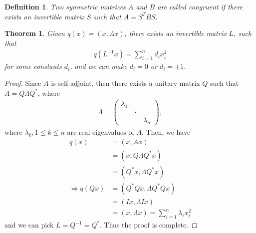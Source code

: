 \documentclass[11pt]{book}
\newtheorem{definition}{Definition}[section]
\newtheorem{theorem}{Theorem}[section]
\theoremstyle{definition}
\numberwithin{equation}{chapter}
\begin{document}
\medskip

\begin{definition}
Two symmetric matrices $A$ and $B$ are called congruent if there exists an invertible matrix $S$ such that $A = S^T B S$.
\end{definition}

\medskip

\begin{theorem}
Given $q(x) = (x, Ax)$, there exists an invertible matrix $L$, such that
\begin{align*}
    q\left(L^{-1}x\right) = \sum^n_{i=1} d_i x_i^2
\end{align*}
for some constants $d_i$, and we can make $d_i = 0$ or $d_i = \pm 1$.
\end{theorem}
\begin{proof}
Since $A$ is self-adjoint, then there exists a unitary matrix $Q$ such that $A = Q\Lambda Q^*$, where 
\begin{align*}
    \Lambda = \begin{pmatrix}
    \lambda_1 &  &  \\
     & \ddots  &  \\
     &   & \lambda_n
    \end{pmatrix},
\end{align*}
where $\lambda_k, 1\leq k \leq n$ are real eigenvalues of $A$. Then, we have
\begin{align*}
    q(x) & = (x, Ax) \\
    & = (x, Q\Lambda Q^* x) \\
    & = (Q^* x, \Lambda Q^* x) \\
    \Rightarrow q(Qx) & = (Q^* Q x, \Lambda Q^* Q x) \\
    & = (Ix, \Lambda I x) \\
    & = (x, \Lambda x) = \sum^n_{i=1} \lambda_i x_i^2
\end{align*}
and we can pick $L = Q^{-1} = Q^*$. Thus the proof is complete.
\end{proof}

\medskip
\end{document}
